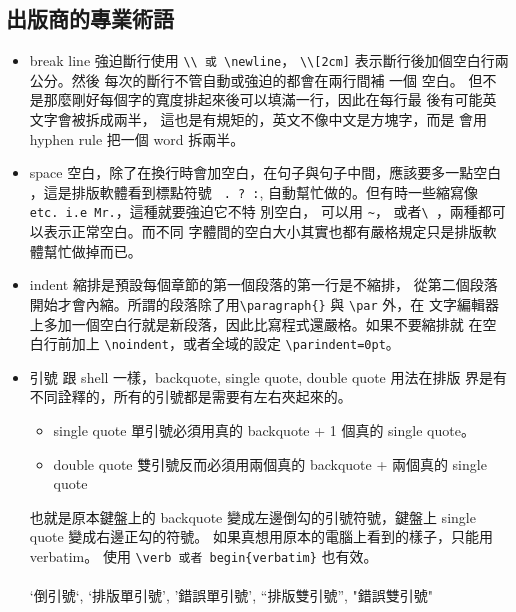  \subsection{出版商的專業術語}
  \begin{itemize}
    \item break line 強迫斷行使用 \verb=\\ 或 \newline=， \verb=\\[2cm]=
      表示斷行後加個空白行兩公分。然後 每次的斷行不管自動或強迫的都會在兩行間補
      一個 空白。 但不是那麼剛好每個字的寬度排起來後可以填滿一行，因此在每行最
      後有可能英文字會被拆成兩半， 這也是有規矩的，英文不像中文是方塊字，而是
      會用 hyphen rule 把一個 word 拆兩半。
    \item space 空白，除了在換行時會加空白，在句子與句子中間，應該要多一點空白
      ，這是排版軟體看到標點符號 \verb= . ? :=, %
      自動幫忙做的。但有時一些縮寫像 \verb=etc. i.e Mr.=，這種就要強迫它不特
      別空白， 可以用 \verb=~=， 或者\verb=\ =，兩種都可以表示正常空白。而不同
      字體間的空白大小其實也都有嚴格規定只是排版軟體幫忙做掉而已。
    \item indent 縮排是預設每個章節的第一個段落的第一行是不縮排， 從第二個段落
      開始才會內縮。所謂的段落除了用\verb=\paragraph{}= 與 \verb=\par= 外，在
      文字編輯器上多加一個空白行就是新段落，因此比寫程式還嚴格。如果不要縮排就
      在空白行前加上 \verb=\noindent=，或者全域的設定 \verb|\parindent=0pt|。
    \item 引號 跟 shell 一樣，backquote, single quote, double quote 用法在排版
      界是有不同詮釋的，所有的引號都是需要有左右夾起來的。
      \begin{itemize}
        \item single quote 單引號必須用真的 backquote + 1 個真的 single quote。
        \item double quote 雙引號反而必須用兩個真的 backquote + 兩個真的 single
          quote
      \end{itemize}
      也就是原本鍵盤上的 backquote 變成左邊倒勾的引號符號，鍵盤上 single quote 
      變成右邊正勾的符號。 如果真想用原本的電腦上看到的樣子，只能用verbatim。
      使用 \verb=\verb 或者 begin{verbatim}= 也有效。\\\\
      `倒引號`, `排版單引號', '錯誤單引號', ``排版雙引號'', "錯誤雙引號"\\\\

\end{itemize}
